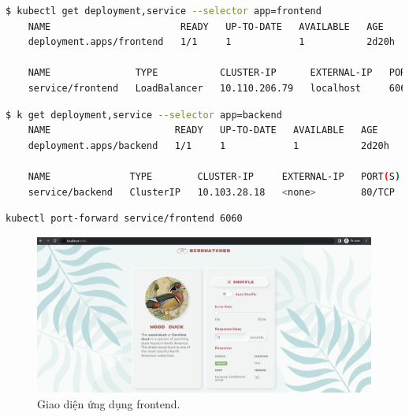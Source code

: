 \documentclass[12pt,a4paper]{report}
\begin{document}
	\hspace{1.0cm}{Sau khi apply, ứng dụng sẽ được triển khai trên sẽ mất một thời gian để ở trạng thái ready. Để kiểm tra trạng thái ứng dụng, chúng ta sẽ chạy lệnh sau:}
	\begin{lstlisting}[language=Bash]
	$ kubectl get deployment,service --selector app=frontend
	NAME                       READY   UP-TO-DATE   AVAILABLE   AGE
	deployment.apps/frontend   1/1     1            1           2d20h
	
	NAME               TYPE           CLUSTER-IP      EXTERNAL-IP   PORT(S)          AGE
	service/frontend   LoadBalancer   10.110.206.79   localhost     6060:32589/TCP   2d20h
	\end{lstlisting}
	\begin{lstlisting}[language=Bash]
	$ k get deployment,service --selector app=backend
	NAME                      READY   UP-TO-DATE   AVAILABLE   AGE
	deployment.apps/backend   1/1     1            1           2d20h
	
	NAME              TYPE        CLUSTER-IP     EXTERNAL-IP   PORT(S)   AGE
	service/backend   ClusterIP   10.103.28.18   <none>        80/TCP    2d20h
	\end{lstlisting}

	\hspace{0.3cm}{Ở đây, con số của trạng thái sẵn sàng là 1/1, thì ứng dụng của chúng ta đã được triển khai thành công. Service của các ứng dụng đã được mở cổng như chúng ta mong đợi. Và tiếp theo, chúng ta sẽ bắt đầu truy cập vào UI của ứng dụng frontend và xem kết quả.}
	
	\hspace{0.3cm}{Để truy cập được vào UI của ứng dụng, chúng ta sẽ sử dụng câu lệnh port-forward để mở port của ứng dụng ra bên ngoài máy của chúng ta. Câu lệnh được thực thi như sau:}
	\begin{lstlisting}[language=Bash]
	kubectl port-forward service/frontend 6060
	\end{lstlisting}
	\pagebreak
	
	\begin{figure}[h]
		\centering
		\includegraphics[width=1\linewidth]{Pics/localhost-6060}
		\caption{\label{fig:localhost-6060} Giao diện ứng dụng frontend.}
		\label{fig:localhost-6060}
	\end{figure}
\end{document}
